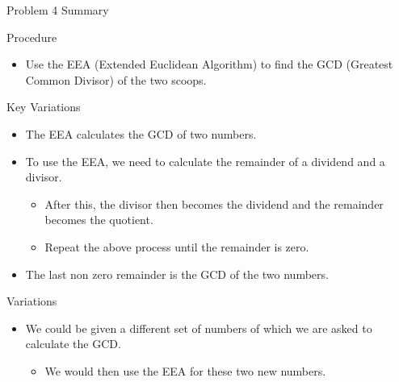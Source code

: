 \begin{summary}{Problem 4 Summary}
    \begin{statement}{Procedure}
        \begin{itemize}
            \item Use the EEA (Extended Euclidean Algorithm) to find the GCD (Greatest Common Divisor) of the two scoops.
        \end{itemize}
    \end{statement}
    \begin{statement}{Key Variations}
        \begin{itemize}
            \item The EEA calculates the GCD of two numbers.
            \item To use the EEA, we need to calculate the remainder of a dividend and a divisor.
            \begin{itemize}
                \item After this, the divisor then becomes the dividend and the remainder becomes the quotient.
                \item Repeat the above process until the remainder is zero.
            \end{itemize}
            \item The last non zero remainder is the GCD of the two numbers.
        \end{itemize}
    \end{statement}
    \begin{statement}{Variations}
        \begin{itemize}
            \item We could be given a different set of numbers of which we are asked to calculate the GCD.
            \begin{itemize}
                \item We would then use the EEA for these two new numbers.
            \end{itemize}
        \end{itemize}
    \end{statement}
\end{summary}

